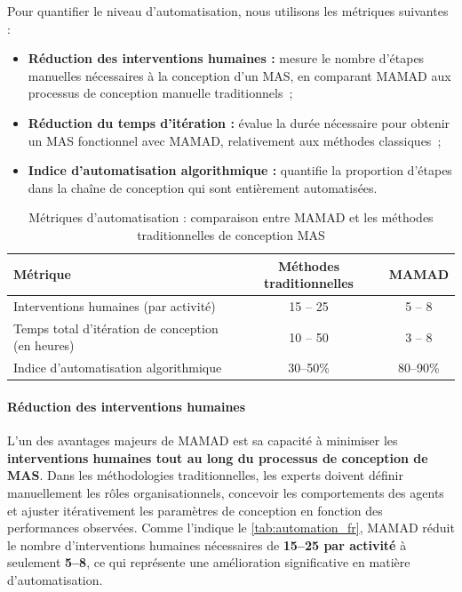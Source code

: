 Pour quantifier le niveau d'automatisation, nous utilisons les métriques suivantes :

\begin{itemize}
    \item \textbf{Réduction des interventions humaines :} mesure le nombre d'étapes manuelles nécessaires à la conception d'un MAS, en comparant MAMAD aux processus de conception manuelle traditionnels~;
    \item \textbf{Réduction du temps d'itération :} évalue la durée nécessaire pour obtenir un MAS fonctionnel avec MAMAD, relativement aux méthodes classiques~;
    \item \textbf{Indice d'automatisation algorithmique :} quantifie la proportion d'étapes dans la chaîne de conception qui sont entièrement automatisées.
\end{itemize}

\begin{table}[h!]
    \centering
    \caption{Métriques d'automatisation : comparaison entre MAMAD et les méthodes traditionnelles de conception MAS}
    \begin{tabular}{lcc}
        \hline
        \textbf{Métrique}                                 & \textbf{Méthodes traditionnelles} & \textbf{MAMAD} \\
        \hline
        Interventions humaines (par activité)             & 15 -- 25                          & 5 -- 8         \\
        \hline
        Temps total d'itération de conception (en heures) & 10 -- 50                          & 3 -- 8         \\
        \hline
        Indice d'automatisation algorithmique             & 30--50\%                          & 80--90\%       \\
        \hline
    \end{tabular}
    \label{tab:automation_fr}
\end{table}

\paragraph{Réduction des interventions humaines}

L'un des avantages majeurs de MAMAD est sa capacité à minimiser les \textbf{interventions humaines tout au long du processus de conception de MAS}. Dans les méthodologies traditionnelles, les experts doivent définir manuellement les rôles organisationnels, concevoir les comportements des agents et ajuster itérativement les paramètres de conception en fonction des performances observées. Comme l'indique le \autoref{tab:automation_fr}, MAMAD réduit le nombre d'interventions humaines nécessaires de \textbf{15--25 par activité} à seulement \textbf{5--8}, ce qui représente une amélioration significative en matière d'automatisation.

